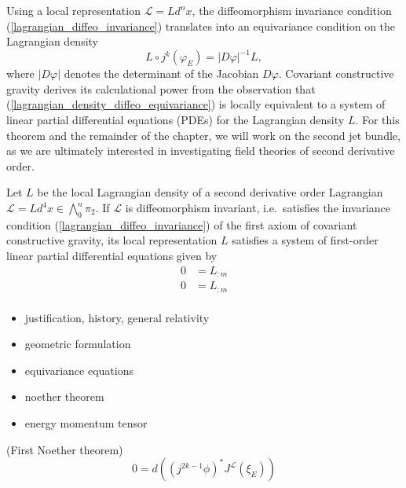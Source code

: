 Using a local representation $\mathcal L = L d^nx$, the diffeomorphism invariance condition (\ref{lagrangian_diffeo_invariance}) translates into an equivariance condition on the Lagrangian density
\begin{equation}\label{lagrangian_density_diffeo_equivariance}
  L \circ j^k(\varphi_E) = \lvert D\varphi\rvert^{-1} L,
\end{equation}
where $\lvert D\varphi\rvert$ denotes the determinant of the Jacobian $D\varphi$. Covariant constructive gravity derives its calculational power from the observation that (\ref{lagrangian_density_diffeo_equivariance}) is locally equivalent to a system of linear partial differential equations (PDEs) for the Lagrangian density $L$. For this theorem and the remainder of the chapter, we will work on the second jet bundle, as we are ultimately interested in investigating field theories of second derivative order.
\begin{theorem}
  Let $L$ be the local Lagrangian density of a second derivative order Lagrangian $\mathcal L = Ld^4x \in \textstyle\bigwedge_0^n\pi_2$. If $\mathcal L$ is diffeomorphism invariant, i.e.~satisfies the invariance condition (\ref{lagrangian_diffeo_invariance}) of the first axiom of covariant constructive gravity, its local representation $L$ satisfies a system of first-order linear partial differential equations given by
  \begin{equation}
    \begin{aligned}
      0 &{} = L_{\colon m} \\
      0 &{} = L_{\colon m} \\
    \end{aligned}
  \end{equation}
\end{theorem}

\begin{itemize}
\item justification, history, general relativity
\item geometric formulation
\item equivariance equations
\item noether theorem
\item energy momentum tensor
\end{itemize}

\begin{proposition}{(First Noether theorem)}
  \begin{equation}
    0 = d \left((j^{2k-1}\phi)^\ast J^\mathcal L(\xi_E)\right)
  \end{equation}
\end{proposition}

